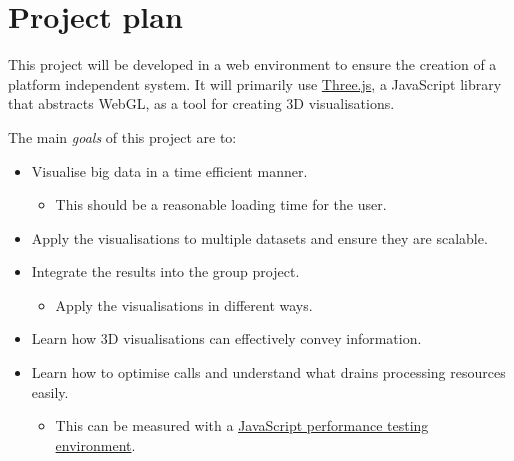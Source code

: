 \documentclass[a4paper]{article}
\begin{document}
	\section{Project plan} {
	\label{sec:project_plan}
	
		
		
		This project will be developed in a web environment to ensure the creation of a platform independent system. It will primarily use \href{http://threejs.org/}{Three.js}, a JavaScript library that abstracts WebGL, as a tool for creating 3D visualisations.
		
		The main \emph{goals} of this project are to:
		
		\begin{itemize}
			\item Visualise big data in a time efficient manner. 
			\begin{itemize}
				\item This should be a reasonable loading time for the user.
			\end{itemize}
			\item Apply the visualisations to multiple datasets and ensure they are scalable. 
			\item Integrate the results into the group project.
			\begin{itemize}
				\item Apply the visualisations in different ways.
			\end{itemize}
			\item Learn how 3D visualisations can effectively convey information.
			\item Learn how to optimise calls and understand what drains processing resources easily.
			\begin{itemize}
				\item This can be measured with a \href{http://jsperf.com/}{JavaScript performance testing environment}.
			\end{itemize}
		\end{itemize}
		
}
\end{document}
